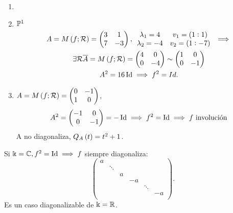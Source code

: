 \begin{example}[(Involuciones)]
    \begin{enumerate}
        \item[]
        \item $\mathbb{P}^1$ \\
            \begin{gather*}
            A = M\left( f; \mathcal{R}\right) =
            \begin{pmatrix}
                3 & 1 \\
                7 & -3
            \end{pmatrix}, \begin{array}{cc}
                \lambda_1 = 4 & v_1 = (1:1) \\
                \lambda_2 = -4 & v_2 = (1:-7)
            \end{array} \implies \\
            \exists\mathcal{R} \overline{A} = M\left( f; \mathcal{R}\right) =
            \begin{pmatrix}
                4 & 0 \\
                0 & -4
            \end{pmatrix} \sim
            \begin{pmatrix}
                1 & 0 \\
                0 & -1
            \end{pmatrix} \\
            A^2 = 16\operatorname{Id} \implies f^2 = Id.
        \end{gather*}
        \item $A = M\left( f;\mathcal{R}\right) =
        \begin{pmatrix}
            0 & -1 \\
            1 & 0
        \end{pmatrix}$,
        \[
            A^2 = \begin{pmatrix}
                -1 & 0 \\
                0 & -1
            \end{pmatrix}
            = -\operatorname{Id} \implies f^2 = \operatorname{Id} \implies f\text{ involución}
        \]
        A no diagonaliza, $Q_A \left( t\right) = t^2+1$.
    \end{enumerate}
\end{example}
\begin{obs}
    Si $\Bbbk = \mathbb{C}, f^2 = \operatorname{Id} \implies f$ siempre diagonaliza:
    \[
        \begin{pmatrix}
            a & & & & & \\
            & \ddots & & & & \\
            & & a & & & \\
            & & & -a & & \\
            & & & & \ddots & \\
            & & & & & -a \\
        \end{pmatrix}.
    \]
    Es un caso diagonalizable de $\Bbbk = \mathbb{R}$.
\end{obs}

